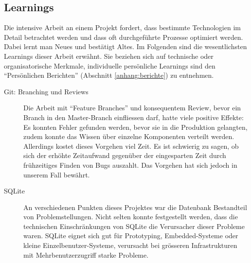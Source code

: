 \subsection{Learnings}

Die intensive Arbeit an einem Projekt fordert, dass bestimmte Technologien im
Detail betrachtet werden und dass oft durchgeführte Prozesse optimiert werden.
Dabei lernt man Neues und bestätigt Altes. Im Folgenden sind die wesentlichsten
Learnings dieser Arbeit erwähnt. Sie beziehen sich auf technische oder
organisatorische Merkmale, individuelle persönliche Learnings sind den
\enquote{Persönlichen Berichten} (Abschnitt \ref{anhang:berichte}) zu entnehmen.

\begin{description}

	\item[Git: Branching und Reviews] Die Arbeit mit \enquote{Feature Branches} und
	konsequentem Review, bevor ein Branch in den Master-Branch einfliessen darf,
	hatte viele positive Effekte: Es konnten Fehler gefunden werden, bevor sie in
	die Produktion gelangten, zudem konnte das Wissen über einzelne Komponenten verteilt
	werden. Allerdings kostet dieses Vorgehen viel Zeit. Es ist schwierig
	zu sagen, ob sich der erhöhte Zeitaufwand gegenüber der eingesparten Zeit
	durch frühzeitiges Finden von Bugs auszahlt. Das Vorgehen hat sich jedoch
	in unserem Fall bewährt.
	
	\item[SQLite] An verschiedenen Punkten dieses Projektes war die Datenbank
	Bestandteil von Problemstellungen. Nicht selten konnte festgestellt werden,
	dass die technischen Einschränkungen von SQLite die Verursacher dieser Probleme
	waren. SQLite eignet sich gut für Prototyping, Embedded-Systeme oder kleine
	Einzelbenutzer-Systeme, verursacht bei grösseren Infrastrukturen mit
	Mehrbenutzerzugriff starke Probleme.
	
\end{description}
